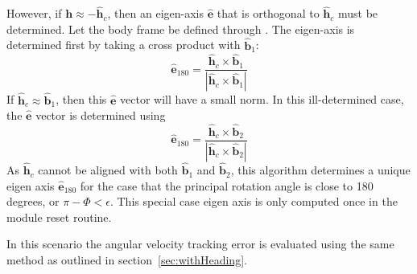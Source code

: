 However, if $\bm h \approx -\hat{\bm h}_{c}$, then an eigen-axis $\hat{\bm e}$ that is orthogonal to $\hat{\bm h}_{c}$ must be determined.  Let the body frame be defined through .  The eigen-axis is determined first by taking a cross product with $\hat{\bm b}_{1}$:
 \begin{equation}
	\label{eq:ssp:7}
	\hat{\bm e}_{180} = \frac{ \hat{\bm h}_{c} \times \hat{\bm b}_{1}}{| \hat{\bm h}_{c} \times \hat{\bm b}_{1}|}
\end{equation}
If $\hat{\bm h}_{c} \approx \hat{\bm b}_{1}$, then this $\hat{\bm e}$ vector will have a small norm.  In this ill-determined case, the $\hat{\bm e}$ vector is determined using
 \begin{equation}
	\label{eq:ssp:8}
	\hat{\bm e}_{180} = \frac{ \hat{\bm h}_{c} \times \hat{\bm b}_{2}}{| \hat{\bm h}_{c} \times \hat{\bm b}_{2}|}
\end{equation}
As $ \hat{\bm h}_{c}$ cannot be aligned with both $\hat{\bm b}_{1}$ and $\hat{\bm b}_{2}$, this algorithm determines a unique eigen axis $\hat{\bm e}_{180}$ for the case that the principal rotation angle is close to 180 degrees, or $\pi - \Phi < \epsilon$.  This special case eigen axis is only computed once in the module reset routine.

In this scenario the angular velocity tracking error is evaluated using the same method as outlined in section~\ref{sec:withHeading}.
 
 